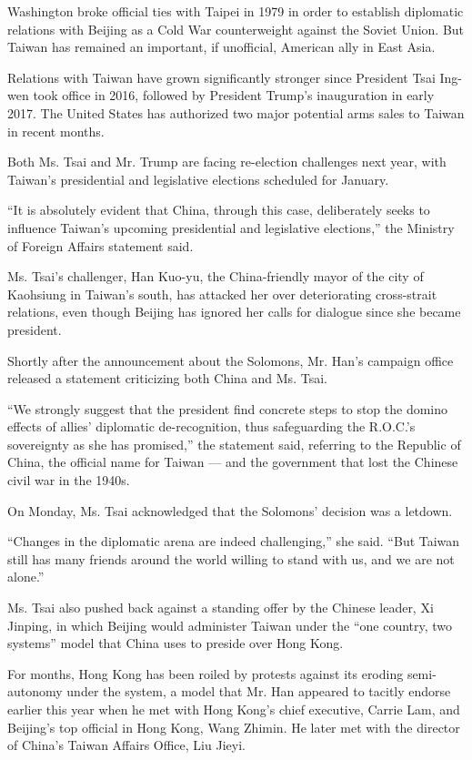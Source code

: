Washington broke official ties with Taipei in 1979 in order to establish
diplomatic relations with Beijing as a Cold War counterweight against
the Soviet Union. But Taiwan has remained an important, if unofficial,
American ally in East Asia.

Relations with Taiwan have grown significantly stronger since President
Tsai Ing-wen took office in 2016, followed by President Trump's
inauguration in early 2017. The United States has authorized two major
potential arms sales to Taiwan in recent months.

Both Ms. Tsai and Mr. Trump are facing re-election challenges next year,
with Taiwan's presidential and legislative elections scheduled for
January.

``It is absolutely evident that China, through this case, deliberately
seeks to influence Taiwan's upcoming presidential and legislative
elections,'' the Ministry of Foreign Affairs statement said.

Ms. Tsai's challenger, Han Kuo-yu, the China-friendly mayor of the city
of Kaohsiung in Taiwan's south, has attacked her over deteriorating
cross-strait relations, even though Beijing has ignored her calls for
dialogue since she became president.

Shortly after the announcement about the Solomons, Mr. Han's campaign
office released a statement criticizing both China and Ms. Tsai.

``We strongly suggest that the president find concrete steps to stop the
domino effects of allies' diplomatic de-recognition, thus safeguarding
the R.O.C.'s sovereignty as she has promised,'' the statement said,
referring to the Republic of China, the official name for Taiwan --- and
the government that lost the Chinese civil war in the 1940s.

On Monday, Ms. Tsai acknowledged that the Solomons' decision was a
letdown.

``Changes in the diplomatic arena are indeed challenging,'' she said.
``But Taiwan still has many friends around the world willing to stand
with us, and we are not alone.''

Ms. Tsai also pushed back against a standing offer by the Chinese
leader, Xi Jinping, in which Beijing would administer Taiwan under the
``one country, two systems'' model that China uses to preside over Hong
Kong.

For months, Hong Kong has been roiled by protests against its eroding
semi-autonomy under the system, a model that Mr. Han appeared to tacitly
endorse earlier this year when he met with Hong Kong's chief executive,
Carrie Lam, and Beijing's top official in Hong Kong, Wang Zhimin. He
later met with the director of China's Taiwan Affairs Office, Liu Jieyi.

